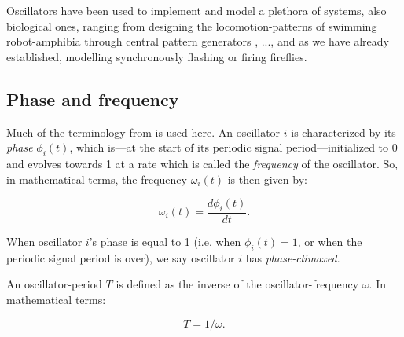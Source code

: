 


	 \nl



Oscillators have been used to implement and model a plethora of systems, also biological ones, ranging from designing the locomotion-patterns of swimming robot-amphibia through central pattern generators \cite{ijspeert_cpg}, ..., and as we have already established, modelling synchronously flashing or firing fireflies.
	
	
	\subsection{Phase and frequency}
	Much of the terminology from \cite{nymoen_synch} is used here. An oscillator $i$ is characterized by its \textit{phase} $\phi_i(t)$, which is—at the start of its periodic signal period—initialized to 0 and evolves towards 1 at a rate which is called the \textit{frequency} of the oscillator. So, in mathematical terms, the frequency $\omega_i(t)$ is then given by:
	
	\begin{equation}
	\label{phase_freq}
		\omega_i(t) = \frac{d \phi_i(t)}{d t} .
	\end{equation}

	When oscillator $i$'s phase is equal to 1 (i.e. when $\phi_i(t)=1$, or when the periodic signal period is over), we say oscillator $i$ has \textit{phase-climaxed}.
	
	An oscillator-period $T$ is defined as the inverse of the oscillator-frequency $\omega$. In mathematical terms:
	
	\begin{equation}
	\label{period_freq}
		T = 1/\omega .
	\end{equation}
	
